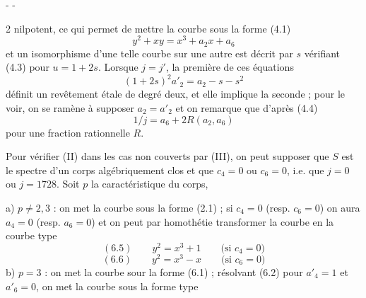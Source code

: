-  -

2 nilpotent, ce qui permet de mettre la courbe sous la forme (4.1)
\[
y^2+xy=x^3+a_2x+a_6
\]
et un isomorphisme d'une telle courbe sur une autre est décrit par $s$ vérifiant (4.3) pour $u=1+2s$. Lorsque $j=j'$, la première de ces équations
\[
(1+2s)^2a'_2=a_2-s-s^2
\]
définit un revêtement étale de degré deux, et elle implique la seconde ; pour le voir, on se ramène à supposer $a_2=a'_2$ et on remarque que d'après (4.4)
\[
1/j=a_6+2R(a_2,a_6)
\]
pour une fraction rationnelle $R$.

Pour vérifier (II) dans les cas non couverts par (III), on peut supposer que $S$ est le spectre d'un corps algébriquement clos et que $c_4=0$ ou $c_6=0$, i.e. que $j=0$ ou $j=1728$. Soit $p$ la caractéristique du corps,

a) $p\ne2,3$ : on met la courbe sous la forme (2.1) ; si $c_4=0$ (resp. $c_6=0$) on aura $a_4=0$ (resp. $a_6=0$) et on peut par homothétie transformer la courbe en la courbe type
\[
(6.5)\qquad y^2=x^3+1\qquad\text{(si }c_4=0\text{)}
\]
\[
(6.6)\qquad y^2=x^3-x\qquad\text{(si }c_6=0\text{)}
\]
b) $p=3$ : on met la courbe sour la forme (6.1) ; résolvant (6.2) pour $a'_4=1$ et $a'_6=0$, on met la courbe sous la forme type
